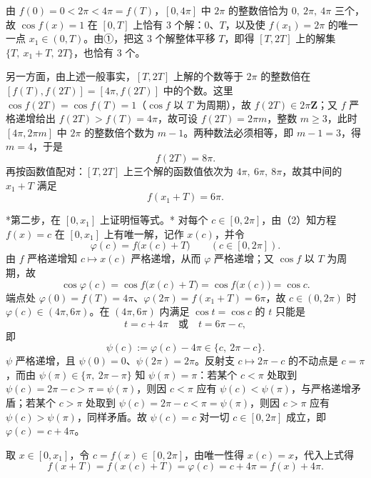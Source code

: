 \begin{answer}
由 \(f(0)=0<2\pi<4\pi=f(T)\)，\([0,4\pi]\) 中 \(2\pi\) 的整数倍恰为 \(0,\ 2\pi,\ 4\pi\) 三个，故 \(\cos f(x)=1\) 在 \([0,T]\) 上恰有 \(3\) 个解：\(0\)、\(T\)，以及使 \(f(x_{1})=2\pi\) 的唯一一点 \(x_{1}\in(0,T)\)。由①，把这 \(3\) 个解整体平移 \(T\)，即得 \([T,2T]\) 上的解集 \(\{T,\ x_{1}+T,\ 2T\}\)，也恰有 \(3\) 个。

另一方面，由上述一般事实，\([T,2T]\) 上解的个数等于 \(2\pi\) 的整数倍在 \([f(T),f(2T)]=[4\pi,f(2T)]\) 中的个数。这里 \(\cos f(2T)=\cos f(T)=1\)（\(\cos f\) 以 \(T\) 为周期），故 \(f(2T)\in2\pi\mathbf{Z}\)；又 \(f\) 严格递增给出 \(f(2T)>f(T)=4\pi\)，故可设 \(f(2T)=2\pi m\)，整数 \(m\geqslant3\)，此时 \([4\pi,2\pi m]\) 中 \(2\pi\) 的整数倍个数为 \(m-1\)。两种数法必须相等，即 \(m-1=3\)，得 \(m=4\)，于是
\nopagebreak[4]
\[
f(2T)=8\pi.
\]
再按函数值配对：\([T,2T]\) 上三个解的函数值依次为 \(4\pi,\ 6\pi,\ 8\pi\)，故其中间的 \(x_{1}+T\) 满足
\nopagebreak[4]
\[
f(x_{1}+T)=6\pi.
\]

*第二步，在 \([0,x_{1}]\) 上证明恒等式。* 对每个 \(c\in[0,2\pi]\)，由（2）知方程 \(f(x)=c\) 在 \([0,x_{1}]\) 上有唯一解，记作 \(x(c)\)，并令
\nopagebreak[4]
\[
\varphi(c)=f\bigl(x(c)+T\bigr)\qquad(c\in[0,2\pi]).
\]
由 \(f\) 严格递增知 \(c\mapsto x(c)\) 严格递增，从而 \(\varphi\) 严格递增；又 \(\cos f\) 以 \(T\) 为周期，故
\nopagebreak[4]
\[
\cos\varphi(c)=\cos f\bigl(x(c)+T\bigr)=\cos f\bigl(x(c)\bigr)=\cos c.
\]
端点处 \(\varphi(0)=f(T)=4\pi\)、\(\varphi(2\pi)=f(x_{1}+T)=6\pi\)，故 \(c\in(0,2\pi)\) 时 \(\varphi(c)\in(4\pi,6\pi)\)。在 \((4\pi,6\pi)\) 内满足 \(\cos t=\cos c\) 的 \(t\) 只能是
\nopagebreak[4]
\[
t=c+4\pi\quad\text{或}\quad t=6\pi-c,
\]
即
\nopagebreak[4]
\[
\psi(c):=\varphi(c)-4\pi\in\{c,\ 2\pi-c\}.
\]
\(\psi\) 严格递增，且 \(\psi(0)=0\)、\(\psi(2\pi)=2\pi\)。反射支 \(c\mapsto2\pi-c\) 的不动点是 \(c=\pi\)，而由 \(\psi(\pi)\in\{\pi,\ 2\pi-\pi\}\) 知 \(\psi(\pi)=\pi\)：若某个 \(c<\pi\) 处取到 \(\psi(c)=2\pi-c>\pi=\psi(\pi)\)，则因 \(c<\pi\) 应有 \(\psi(c)<\psi(\pi)\)，与严格递增矛盾；若某个 \(c>\pi\) 处取到 \(\psi(c)=2\pi-c<\pi=\psi(\pi)\)，则因 \(c>\pi\) 应有 \(\psi(c)>\psi(\pi)\)，同样矛盾。故 \(\psi(c)=c\) 对一切 \(c\in[0,2\pi]\) 成立，即 \(\varphi(c)=c+4\pi\)。

取 \(x\in[0,x_{1}]\)，令 \(c=f(x)\in[0,2\pi]\)，由唯一性得 \(x(c)=x\)，代入上式得
\nopagebreak[4]
\[
f(x+T)=f(x(c)+T)=\varphi(c)=c+4\pi=f(x)+4\pi.
\]


\end{answer}
